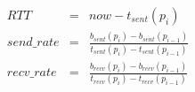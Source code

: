 
\begin{subequations}
    \begin{align}
        RTT &= &now -  t_{sent}(p_i)\\
        send\_rate &= &\frac{b_{sent}(p_i) - b_{sent}(p_{i-1})}{t_{sent}(p_i)-t_{sent}(p_{i-1})}\\
        recv\_rate &= &\frac{b_{recv}(p_i) - b_{recv}(p_{i-1})}{t_{recv}(p_i)-t_{recv}(p_{i-1})}
    \end{align}
\end{subequations}



